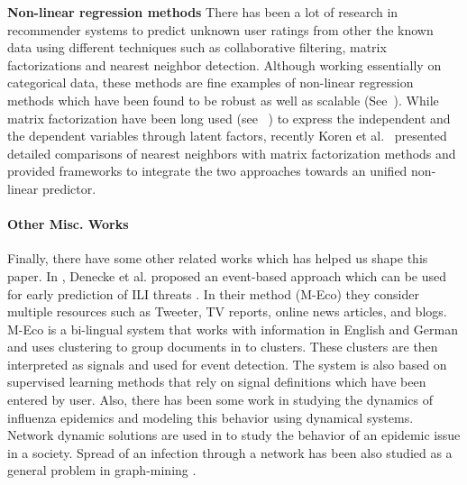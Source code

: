 \textbf{Non-linear regression methods}
There has been a lot of research in recommender systems to predict unknown user 
ratings from other the known data using different techniques such as collaborative 
filtering, matrix factorizations and nearest neighbor detection. Although
working essentially on categorical data, these methods are fine examples of non-linear
regression methods which have been found to be robust as well as scalable (See~\cite{kore2008factor}).
While matrix factorization have been long used (see ~\cite{canny2002factor}) to 
express the independent and the dependent variables through latent factors, 
recently Koren et al.~\cite{koren2008factor} presented detailed comparisons
of nearest neighbors with matrix factorization methods and provided frameworks to 
integrate the two approaches towards an unified non-linear predictor.

\paragraph{Other Misc. Works}
Finally, there have some other related works which has helped us shape this paper. 
In \cite{ref3}, Denecke et al.
proposed an event-based approach which can be used for early prediction
of ILI threats \cite{ref3}. In their method (M-Eco) they consider
multiple resources such as Tweeter, TV reports, online news articles,
and blogs. M-Eco is a bi-lingual system that works with information in
English and German and uses clustering to group documents in to
clusters. These clusters are then interpreted as signals and used for
event detection. The system is also based on supervised learning methods
that rely on signal definitions which have been entered by user.
Also, there has been some work in studying the dynamics of influenza epidemics and
modeling this behavior using dynamical systems. Network dynamic solutions are used in
\cite{ref11} to study the behavior of an epidemic issue in a society.
Spread of an infection through a network has been also studied as a
general problem in graph-mining \cite{ref13} \cite{ref14}. 
 

